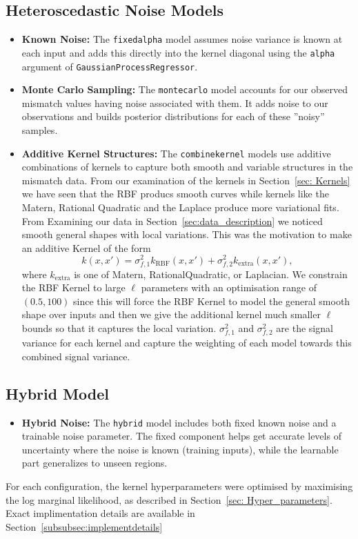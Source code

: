 \documentclass{ucdgradtaughtthesis}
\begin{document}
\subsection{Heteroscedastic Noise Models}
\begin{itemize}
    \item \textbf{Known Noise:} The \texttt{fixedalpha} model assumes noise variance is known at each input and adds this directly into the kernel diagonal using the \texttt{alpha} argument of \texttt{GaussianProcessRegressor}.
    \item \textbf{Monte Carlo Sampling:} The \texttt{montecarlo} model accounts for our observed mismatch values having noise associated with them. It adds noise to our observations and builds posterior distributions for each of these ''noisy'' samples. 
    \item \textbf{Additive Kernel Structures:} The \texttt{combinekernel} models use additive combinations of kernels to capture both smooth and variable structures in the mismatch data. From our examination of the kernels in Section~\ref{sec: Kernels} we have seen that the RBF producs smooth curves while kernels like the Matern, Rational Quadratic and the Laplace produce more variational fits.
            From Examining our data in Section~\ref{sec:data_description} we noticed smooth general shapes with local variations. This was the motivation to make an additive Kernel of the form 
    \begin{equation}
        k(x, x') = \sigma_{f,1}^2k_{\mathrm{RBF}}(x, x') + \sigma_{f,2}^2k_{\mathrm{extra}}(x, x'),
    \end{equation}
    where \(k_{\mathrm{extra}}\) is one of Matern, RationalQuadratic, or Laplacian. We constrain the RBF Kernel to large \(\ell\) parameters with an optimisation range of \((0.5,100)\) since this will force the RBF Kernel to model the general smooth shape over inputs
    and then we give the additional kernel much smaller \(\ell\) bounds so that it captures the local variation. \(\sigma_{f,1}^2\) and \(\sigma_{f,2}^2\) are the signal variance for each kernel and capture the weighting of each model towards this combined signal variance.
\end{itemize}
%
%

\noindent
\subsection{Hybrid Model}
\begin{itemize}
    \item \textbf{Hybrid Noise:} The \texttt{hybrid} model includes both fixed known noise and a trainable noise parameter. The fixed component helps get accurate levels of uncertainty where the noise is known (training inputs), while the learnable part generalizes to unseen regions.
\end{itemize}
%
For each configuration, the kernel hyperparameters were optimised by maximising the log marginal likelihood, as described in Section~\ref{sec: Hyper_parameters}. Exact implimentation details
are available in Section~\ref{subsubsec:implementdetails}
%
%
%
\end{document}
